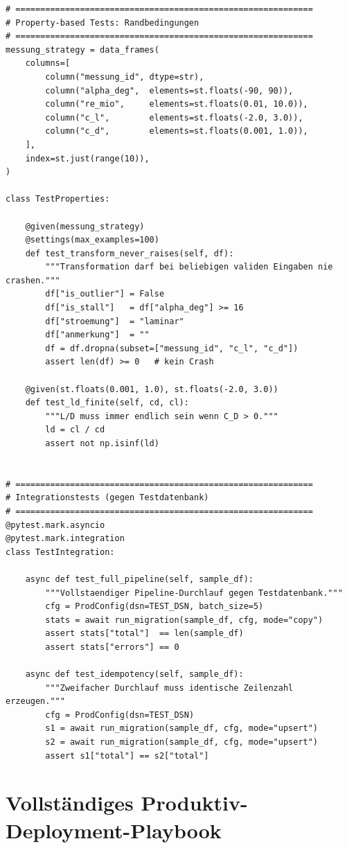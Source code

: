 \documentclass[12pt,a4paper]{report}
\theoremstyle{definition}
\theoremstyle{remark}
\begin{document}
\begin{lstlisting}[style=python, caption={test\_etl.py: Vollständige Testsuite mit pytest und hypothesis}]
# ============================================================
# Property-based Tests: Randbedingungen
# ============================================================
messung_strategy = data_frames(
    columns=[
        column("messung_id", dtype=str),
        column("alpha_deg",  elements=st.floats(-90, 90)),
        column("re_mio",     elements=st.floats(0.01, 10.0)),
        column("c_l",        elements=st.floats(-2.0, 3.0)),
        column("c_d",        elements=st.floats(0.001, 1.0)),
    ],
    index=st.just(range(10)),
)

class TestProperties:

    @given(messung_strategy)
    @settings(max_examples=100)
    def test_transform_never_raises(self, df):
        """Transformation darf bei beliebigen validen Eingaben nie crashen."""
        df["is_outlier"] = False
        df["is_stall"]   = df["alpha_deg"] >= 16
        df["stroemung"]  = "laminar"
        df["anmerkung"]  = ""
        df = df.dropna(subset=["messung_id", "c_l", "c_d"])
        assert len(df) >= 0   # kein Crash

    @given(st.floats(0.001, 1.0), st.floats(-2.0, 3.0))
    def test_ld_finite(self, cd, cl):
        """L/D muss immer endlich sein wenn C_D > 0."""
        ld = cl / cd
        assert not np.isinf(ld)


# ============================================================
# Integrationstests (gegen Testdatenbank)
# ============================================================
@pytest.mark.asyncio
@pytest.mark.integration
class TestIntegration:

    async def test_full_pipeline(self, sample_df):
        """Vollstaendiger Pipeline-Durchlauf gegen Testdatenbank."""
        cfg = ProdConfig(dsn=TEST_DSN, batch_size=5)
        stats = await run_migration(sample_df, cfg, mode="copy")
        assert stats["total"]  == len(sample_df)
        assert stats["errors"] == 0

    async def test_idempotency(self, sample_df):
        """Zweifacher Durchlauf muss identische Zeilenzahl erzeugen."""
        cfg = ProdConfig(dsn=TEST_DSN)
        s1 = await run_migration(sample_df, cfg, mode="upsert")
        s2 = await run_migration(sample_df, cfg, mode="upsert")
        assert s1["total"] == s2["total"]
\end{lstlisting}

\chapter{Vollständiges Produktiv-Deployment-Playbook}
\label{sec:playbook}
\end{document}
